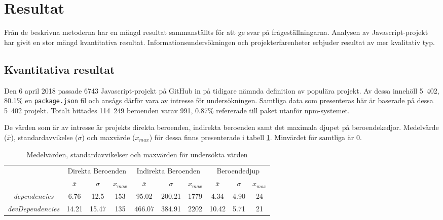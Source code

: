 \section{Resultat}
\label{sec:joel_o-results}
Från de beskrivna metoderna har en mängd resultat sammanställts för att ge svar på frågeställningarna. Analysen av Javascript-projekt har givit en stor mängd kvantitativa resultat. Informationsundersökningen och projekterfarenheter erbjuder resultat av mer kvalitativ typ.

\subsection{Kvantitativa resultat}
\label{sec:joel_o-results-kvant}
Den 6 april 2018 passade 6743 Javascript-projekt på GitHub in på tidigare nämnda definition av populära projekt. Av dessa innehöll 5~402, 80.1\% en \texttt{package.json} fil och ansågs därför vara av intresse för undersökningen. Samtliga data som presenteras här är baserade på dessa 5~402 projekt. Totalt hittades 114~249 beroenden varav 991, 0.87\% refererade till paket utanför npm-systemet.

De värden som är av intresse är projekts direkta beroenden, indirekta beroenden samt det maximala djupet på beroendekedjor. Medelvärde ($\bar{x}$), standardavvikelse ($\sigma$) och maxvärde ($x_{max}$) för dessa finns presenterade i tabell \ref{tab:beroende-data}. Minvärdet för samtliga är 0.

\begin{table}
  \centering
  \begin{tabular}{c | c c c | c c c | c c c |}
    \cline{2-10}
    & \multicolumn{3}{c|}{Direkta Beroenden} & \multicolumn{3}{c|}{Indirekta Beroenden} & \multicolumn{3}{c|}{Beroendedjup} \\ \cline{2-10}
    & $\bar{x}$ & $\sigma$ & $x_{max}$ & $\bar{x}$ & $\sigma$ & $x_{max}$ & $\bar{x}$ & $\sigma$ & $x_{max}$ \\ \hline
    \multicolumn{1}{|c|}{\textit{dependencies}} & 6.76 & 12.5 & 153 & 95.02 & 200.21 & 1779 & 4.34 & 4.90 & 24 \\ \hline
    \multicolumn{1}{|c|}{\textit{devDependencies}} & 14.21 & 15.47 & 135 & 466.07 & 384.91 & 2202 & 10.42 & 5.71 & 21 \\
    \hline
  \end{tabular}
  \caption{Medelvärden, standardavvikelser och maxvärden för undersökta värden}
  \label{tab:beroende-data}
\end{table}

